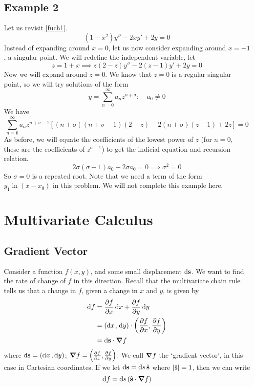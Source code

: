 \documentclass{article}
\begin{document}
\subsection{Example 2}
Let us revisit \eqref{fuch1}.
\[ (1-x^2)y'' - 2xy' + 2y = 0 \]
Instead of expanding around $x=0$, let us now consider expanding around $x=-1$, a singular point. We will redefine the independent variable, let
\[ z = 1 + x \implies z(2-z)y'' - 2(z-1)y' + 2y = 0 \]
Now we will expand around $z=0$. We know that $z=0$ is a regular singular point, so we will try solutions of the form
\[ y = \sum_{n=0}^\infty a_nz^{n+\sigma};\quad a_0 \neq 0 \]
We have
\[ \sum_{n=0}^\infty a_nz^{n+\sigma-1}\left[ (n+\sigma)(n+\sigma-1)(2-z) - 2(n+\sigma)(z-1) + 2z \right] = 0 \]
As before, we will equate the coefficients of the lowest power of $z$ (for $n=0$, these are the coefficients of $z^{\sigma - 1}$) to get the indicial equation and recursion relation.
\[ 2\sigma(\sigma - 1)a_0 + 2\sigma a_0 = 0 \implies \sigma^2 = 0 \]
So $\sigma = 0$ is a repeated root. Note that we need a term of the form $y_1\ln (x-x_0)$ in this problem. We will not complete this example here.

\section{Multivariate Calculus}
\subsection{Gradient Vector}
Consider a function $f(x, y)$, and some small displacement $\dd \vb s$. We want to find the rate of change of $f$ in this direction. Recall that the multivariate chain rule tells us that a change in $f$, given a change in $x$ and $y$, is given by
\begin{align*}
	\dd{f} & = \frac{\partial f}{\partial x} \dd{x} + \frac{\partial f}{\partial y}\dd{y}                         \\
	       & = (\dd{x}, \dd{y}) \cdot \left( \frac{\partial f}{\partial x}, \frac{\partial f}{\partial y} \right) \\
	       & = \dd \vb s \cdot \grad f
\end{align*}
where $\dd \vb s = (\dd{x}, \dd{y})$; $\grad f = \left( \frac{\partial f}{\partial x}, \frac{\partial f}{\partial y} \right)$. We call $\grad f$ the `gradient vector', in this case in Cartesian coordinates. If we let $\dd \vb s = \dd{s} \hat{\vb s}$ where $\abs{\hat{\vb s}} = 1$, then we can write
\[ \dd{f} = \dd{s} (\hat{\vb s}\cdot \grad f) \]
\end{document}
